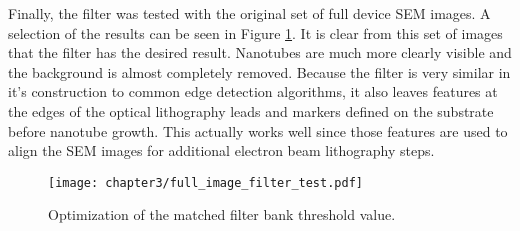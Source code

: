 Finally, the filter was tested with the original set of full device SEM images. A selection of the results can be seen in Figure \ref{fig:full_image_filter}. It is clear from this set of images that the filter has the desired result. Nanotubes are much more clearly visible and the background is almost completely removed. Because the filter is very similar in it's construction to common edge detection algorithms, it also leaves features at the edges of the optical lithography leads and markers defined on the substrate before nanotube growth. This actually works well since those features are used to align the SEM images for additional electron beam lithography steps. 

\begin{figure}
	\centering
	\texttt{[image: chapter3/full\_image\_filter\_test.pdf]}
	\caption{Optimization of the matched filter bank threshold value.}
	\label{fig:full_image_filter}
\end{figure}